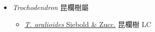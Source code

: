 
  \begin{itemize}
 \item[] \textit{Trochodendron} 昆欄樹屬
                    
  \begin{itemize}
        \item[] \href{http://www.theplantlist.org/tpl1.1/search?q=Trochodendron+aralioides}{\textit{T. aralioides} Siebold \& Zucc.}   昆欄樹 LC
  \end{itemize}
  \end{itemize}
